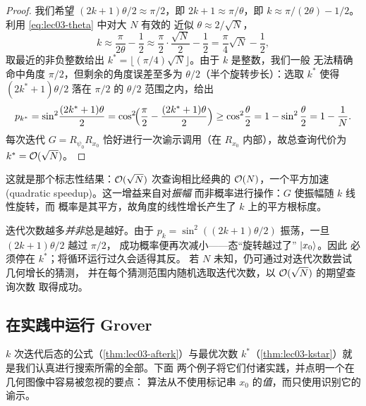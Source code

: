 \begin{proof}
我们希望 $(2k+1)\theta/2\approx\pi/2$，即 $2k+1\approx\pi/\theta$，即
$k\approx\pi/(2\theta)-1/2$。利用 \eqref{eq:lec03-theta} 中对大 $N$ 有效的
近似 $\theta\approx2/\sqrt N$，
\[
  k\approx\frac{\pi}{2\theta}-\frac12\approx\frac{\pi}{2}\cdot\frac{\sqrt N}{2}-\frac12
     =\frac{\pi}{4}\sqrt N-\frac12,
\]
取最近的非负整数给出
$k^{\ast}=\lfloor(\pi/4)\sqrt N\rfloor$。由于 $k$ 是整数，我们一般
无法精确命中角度 $\pi/2$，但剩余的角度误差至多为
$\theta/2$（半个旋转步长）：选取 $k^{\ast}$ 使得
$(2k^{\ast}+1)\theta/2$ 落在 $\pi/2$ 的 $\theta/2$ 范围之内，给出
\[
  p_{k^{\ast}}=\sin^{2}\!\frac{(2k^{\ast}+1)\theta}{2}
    =\cos^{2}\!\Bigl(\frac{\pi}{2}-\frac{(2k^{\ast}+1)\theta}{2}\Bigr)
    \ge\cos^{2}\!\frac{\theta}{2}=1-\sin^{2}\frac{\theta}{2}=1-\frac1N.
\]
每次迭代 $G=R_{\psi_0}R_{x_0}$ 恰好进行一次谕示调用（在
$R_{x_0}$ 内部），故总查询代价为 $k^{\ast}=\mathcal{O}(\sqrt N)$。
\end{proof}

这就是那个标志性结果：$\mathcal{O}(\sqrt N)$ 次查询相比经典的
$\mathcal{O}(N)$，一个平方加速 (quadratic speedup)。这一增益来自对\emph{振幅}
而非概率进行操作：$G$ 使振幅随 $k$ 线性旋转，而
概率是其平方，故角度的线性增长产生了
$k$ 上的平方根标度。

\begin{remark}[不要过度旋转]
\label{rem:lec03-overrotate}
迭代次数越多\emph{并非}总是越好。由于
$p_k=\sin^{2}((2k+1)\theta/2)$ 振荡，一旦 $(2k+1)\theta/2$ 越过 $\pi/2$，
成功概率便再次减小——态“旋转越过了” $\ket{x_0}$。因此
必须停在 $k^{\ast}$；将循环运行过久会适得其反。
若 $N$ 未知，仍可通过对迭代次数尝试几何增长的猜测，
并在每个猜测范围内随机选取迭代次数，以 $\mathcal{O}(\sqrt N)$ 的期望查询次数
取得成功。
\end{remark}

\subsection{在实践中运行 Grover}

$k$ 次迭代后态的公式（\cref{thm:lec03-afterk}）与最优次数
$k^{\ast}$（\cref{thm:lec03-kstar}）就是我们认真进行搜索所需的全部。下面
两个例子将它们付诸实践，并点明一个在几何图像中容易被忽视的要点：
算法从不使用标记串 $x_0$ 的\emph{值}，而只使用识别它的谕示。


